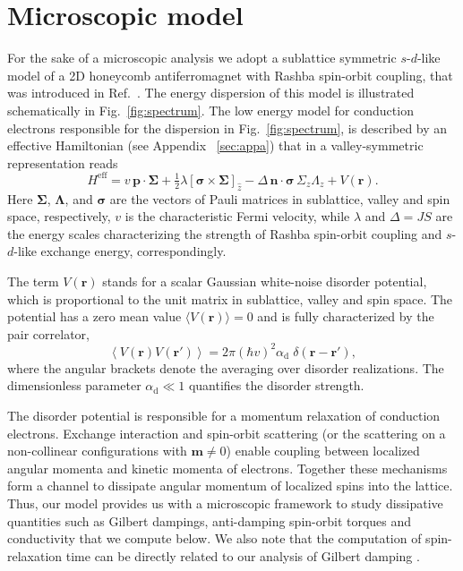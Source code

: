 \documentclass[%
  twocolumn,
  aps,
  prb,
  amsmath,
  amssymb,
  superscriptaddress,
  nofootinbib,
  floatfix
]{revtex4-1}
\newcommand{\be}{\begin{equation}}
\newcommand{\e}{\end{equation}}
\newcommand{\lt}{\left}
\newcommand{\rt}{\right}
\newcommand{\la}{\langle}
\newcommand{\ra}{\rangle}
\newcommand{\bb}{\boldsymbol}
\newcommand{\0}{^{\phantom{\dagger}}}
\begin{document}
\section{Microscopic model}

For the sake of a microscopic analysis we adopt a sublattice symmetric $s$-$d$-like model of a 2D honeycomb antiferromagnet with Rashba spin-orbit coupling, that was introduced in Ref.~. The energy dispersion of this model is illustrated schematically in Fig.~\ref{fig:spectrum}.  
The low energy model for conduction electrons responsible for the dispersion in Fig.~\ref{fig:spectrum}, is described by an effective Hamiltonian (see Appendix ~\ref{sec:appa}) that in a valley-symmetric representation reads
\be
\label{eff}
H^\textrm{eff}= v\, \bb{p}\cdot\bb{\Sigma}+\tfrac{1}{2}\lambda\lt[\bb{\sigma}\times\bb{\Sigma}\rt]_{\hat{z}} - \Delta\,\bb{n}\cdot\bb{\sigma}\,\Sigma_z\Lambda_z + V(\bb{r}).
\e
Here $\bb{\Sigma}$, $\bb{\Lambda}$, and $\bb{\sigma}$ are the vectors of Pauli matrices in sublattice, valley and spin space, respectively, $v$ is the characteristic Fermi velocity, while $\lambda$ and $\Delta=JS$ are the energy scales characterizing the strength of Rashba spin-orbit coupling and $s$-$d$-like exchange energy, correspondingly. 

The term $V(\bb{r})$ stands for a scalar Gaussian white-noise disorder potential, which is proportional to the unit matrix in sublattice, valley and spin space. The potential has a zero mean value $\la V(\bb{r}) \ra=0$ and is fully characterized by the pair correlator,
\be
\lt\la V(\bb{r}) V(\bb{r}') \rt\ra = 2\pi (\hbar v)^2 \alpha_\textrm{d}\;\delta(\bb{r}-\bb{r}'),
\e
where the angular brackets denote the averaging over disorder realizations. The dimensionless parameter $\alpha_\textrm{d}\ll 1$ quantifies the disorder strength. 

The disorder potential is responsible for a momentum relaxation of conduction electrons. Exchange interaction and spin-orbit scattering (or the scattering on a non-collinear configurations with $\bb{m}\neq 0$) enable coupling between localized angular momenta and kinetic momenta of electrons. Together these mechanisms form a channel to dissipate angular momentum of localized spins into the lattice. Thus, our model provides us with a microscopic framework to study dissipative quantities such as Gilbert dampings, anti-damping spin-orbit torques and conductivity that we compute below. We also note that the computation of spin-relaxation time can be directly related to our analysis of Gilbert damping \cite{Hankiewicz2007,Manchon2017}. 
\end{document}
